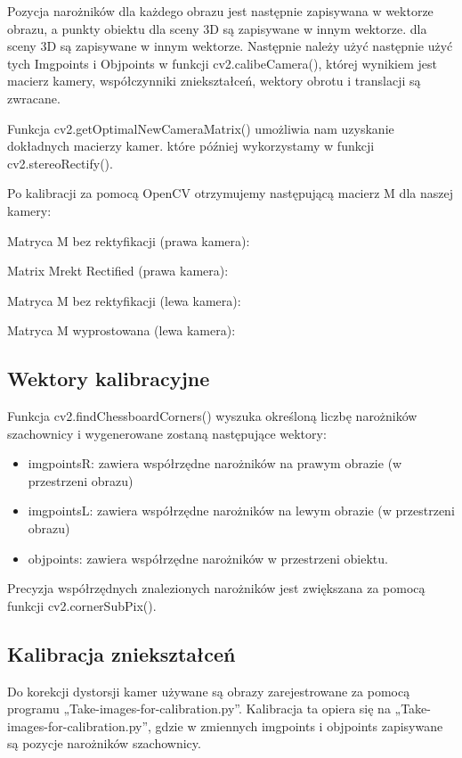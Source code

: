 \documentclass[magisterska]{pracadypl}
\begin{document}
Pozycja narożników dla każdego obrazu jest następnie zapisywana w wektorze obrazu, a punkty obiektu dla sceny 3D są zapisywane w innym wektorze.
dla sceny 3D są zapisywane w innym wektorze. Następnie należy użyć
następnie użyć tych Imgpoints i Objpoints w funkcji cv2.calibeCamera(), której wynikiem jest
macierz kamery, współczynniki zniekształceń, wektory obrotu i translacji
są zwracane.

Funkcja cv2.getOptimalNewCameraMatrix() umożliwia nam uzyskanie dokładnych macierzy kamer.
które później wykorzystamy w funkcji cv2.stereoRectify().

Po kalibracji za pomocą OpenCV otrzymujemy następującą macierz M dla naszej kamery:

Matryca M bez rektyfikacji (prawa kamera):

Matrix Mrekt Rectified (prawa kamera):

Matryca M bez rektyfikacji (lewa kamera):

Matryca M wyprostowana (lewa kamera):

\subsection{Wektory kalibracyjne}

Funkcja cv2.findChessboardCorners() wyszuka określoną liczbę narożników szachownicy
i wygenerowane zostaną następujące wektory:

\begin{itemize}
  \item imgpointsR: zawiera współrzędne narożników na prawym obrazie (w przestrzeni obrazu)
  \item imgpointsL: zawiera współrzędne narożników na lewym obrazie (w przestrzeni obrazu)
  \item objpoints: zawiera współrzędne narożników w przestrzeni obiektu.
\end{itemize}

Precyzja współrzędnych znalezionych narożników jest zwiększana za pomocą funkcji
cv2.cornerSubPix().

\subsection{Kalibracja zniekształceń}

Do korekcji dystorsji kamer używane są obrazy zarejestrowane za pomocą programu „Take-images-for-calibration.py”. Kalibracja ta opiera się na „Take-images-for-calibration.py”, gdzie w zmiennych imgpoints i objpoints zapisywane są pozycje narożników szachownicy.
\end{document}
